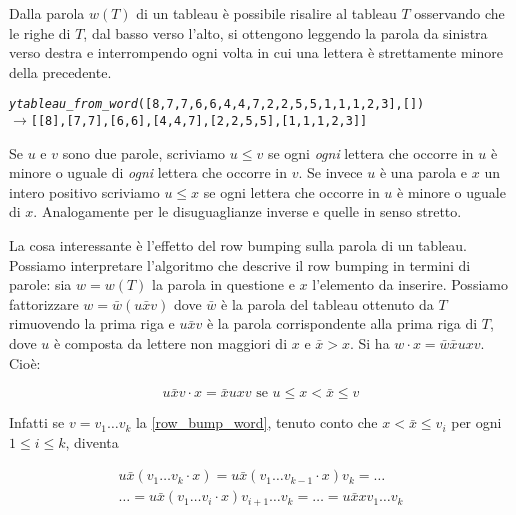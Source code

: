 \begin{oss}
Dalla parola $w(T)$ di un tableau \`e possibile risalire al tableau
$T$ osservando che le righe di $T$, dal basso verso l'alto, si
ottengono leggendo la parola da sinistra verso destra e interrompendo
ogni volta in cui una lettera \`e strettamente minore della
precedente.
\begin{alltt}
\emph{ytableau\_from\_word} ([8,7,7,6,6,4,4,7,2,2,5,5,1,1,1,2,3], [])
\(\rightarrow\) [[8],[7,7],[6,6],[4,4,7],[2,2,5,5],[1,1,1,2,3]]
\end{alltt}
\end{oss}

\begin{notaz}
Se $u$ e $v$ sono due parole, scriviamo $u \leq v$ se ogni
\emph{ogni} lettera che occorre in $u$ \`e minore o uguale di \emph{ogni} lettera
che occorre in $v$. Se invece $u$ \`e una parola e $x$ un intero
positivo scriviamo $u \leq x$ se ogni lettera che occorre in $u$ \`e
minore o uguale di $x$. Analogamente per le disuguaglianze inverse e quelle in senso stretto. 
\end{notaz}

La cosa interessante \`e l'effetto del row bumping sulla
parola di un tableau. 
Possiamo interpretare l'algoritmo che descrive
il row bumping in termini di parole: sia $w = w(T)$ la parola in questione e
$x$ l'elemento da inserire. Possiamo fattorizzare $w=\bar w (u \bar x
v)$ dove $\bar w$ \`e la parola del tableau ottenuto da $T$ rimuovendo
la prima riga e $u \bar x v$ \`e la parola corrispondente
alla prima riga di $T$, dove $u$ \`e composta da lettere non maggiori
di $x$ e $\bar x > x$. Si ha $w \cdot x = \bar w \bar x u x
v$. Cio\`e:

\begin{equation}\label{row_bump_word}
u \bar x v \cdot x = \bar x u
  x v \mbox{ se } u \leq x < \bar x \leq v
\end{equation}

Infatti se $v=v_1 \ldots v_k$ la \eqref{row_bump_word}, tenuto conto che
$x < \bar x \leq v_i$ per ogni $1 \leq i \leq k$, diventa

\begin{equation}\label{pre_bump}
\begin{split}
u \bar x (v_1 \ldots v_k \cdot x)
= u \bar x (v_1 \ldots v_{k-1}
\cdot x )v_k = \ldots\\
\ldots = u \bar x (v_1 \ldots
v_i \cdot x )v_{i+1} \ldots v_k = \ldots
= u \bar x x v_1 \ldots v_k
\end{split}
\end{equation}


